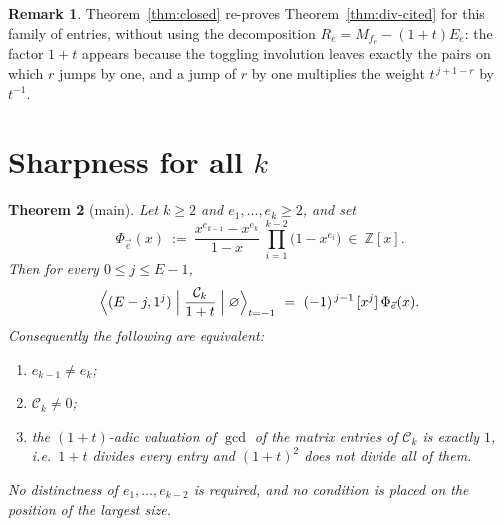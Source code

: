 \documentclass[11pt]{article}
\newtheorem{theorem}{Theorem}
\theoremstyle{definition}
\newtheorem{remark}[theorem]{Remark}
\newcommand{\Ck}{\mathcal{C}}
\newcommand{\Z}{\mathbb{Z}}
\begin{document}
\begin{remark}
Theorem~\ref{thm:closed} re-proves Theorem~\ref{thm:div-cited} for this family of entries,
without using the decomposition $R_e=M_{f_e}-(1+t)E_e$: the factor $1+t$ appears because the
toggling involution leaves exactly the pairs on which $r$ jumps by one, and a jump of $r$ by
one multiplies the weight $t^{\,j+1-r}$ by $t^{-1}$.
\end{remark}

\section{Sharpness for all $k$}

\begin{theorem}[main]\label{thm:main}
Let $k\ge2$ and $e_1,\dots,e_k\ge2$, and set
\[
  \Phi_{\vec e}(x)\ :=\ \frac{x^{e_{k-1}}-x^{e_k}}{1-x}\ \prod_{i=1}^{k-2}\bigl(1-x^{e_i}\bigr)\ \in\ \Z[x].
\]
Then for every $0\le j\le E-1$,
\begin{equation}\label{eq:phi}
  \Bigl\langle (E-j,1^{j})\Bigm|\frac{\Ck_k}{1+t}\Bigm|\varnothing\Bigr\rangle_{t=-1}
  \ =\ (-1)^{\,j-1}\,[x^{j}]\,\Phi_{\vec e}(x).
\end{equation}
Consequently the following are equivalent:
\begin{enumerate}
\item[(i)] $e_{k-1}\ne e_k$;
\item[(ii)] $\Ck_k\ne0$;
\item[(iii)] the $(1+t)$-adic valuation of $\gcd$ of the matrix entries of $\Ck_k$ is
      exactly $1$, i.e.\ $1+t$ divides every entry and $(1+t)^2$ does not divide all of them.
\end{enumerate}
No distinctness of $e_1,\dots,e_{k-2}$ is required, and no condition is placed on the
position of the largest size.
\end{theorem}
\end{document}
